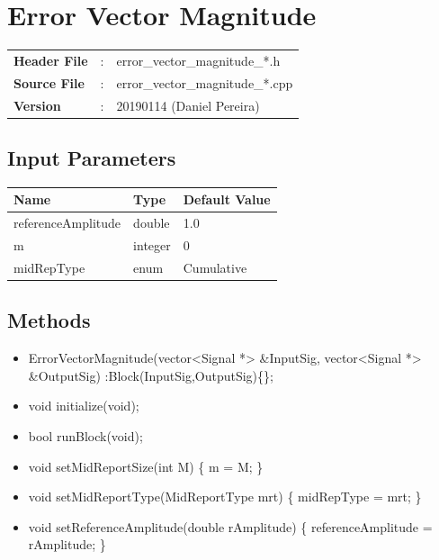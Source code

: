 \clearpage

\section{Error Vector Magnitude}
\label{sec:error_vector_magnitude}
\begin{refsection}

\begin{tcolorbox}	
\begin{tabular}{p{2.75cm} p{0.2cm} p{10.5cm}} 	
\textbf{Header File}    &:& error\_vector\_magnitude\_*.h \\
\textbf{Source File}    &:& error\_vector\_magnitude\_*.cpp \\
\textbf{Version}        &:& 20190114 (Daniel Pereira)
\end{tabular}
\end{tcolorbox}

\subsection*{Input Parameters}

\begin{table}[H]
\centering
\begin{tabular}{|l|l|l|}
\hline
Name               & Type           & Default Value     \\ \hline
referenceAmplitude & double         & 1.0              \\ \hline
m                  & integer        & 0                 \\ \hline
midRepType         & enum           & Cumulative \\ \hline
\end{tabular}
\end{table}


\subsection*{Methods}

\begin{itemize}
  \item ErrorVectorMagnitude(vector<Signal *> \&InputSig, vector<Signal *> \&OutputSig) :Block(InputSig,OutputSig)\{\};
  \item void initialize(void);
  \item bool runBlock(void);
  \item void setMidReportSize(int M) \{ m = M; \}
  \item void setMidReportType(MidReportType mrt) \{ midRepType = mrt; \}
  \item void setReferenceAmplitude(double rAmplitude) \{ referenceAmplitude = rAmplitude; \}
	

\end{itemize}
\end{refsection}
